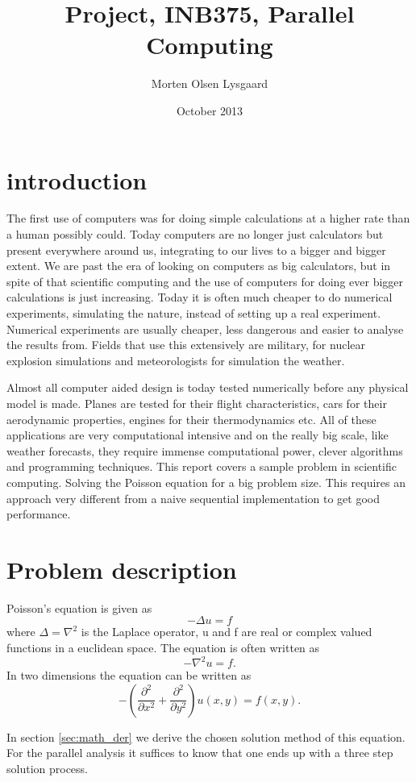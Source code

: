 \documentclass{article}
\title{Project, INB375, Parallel Computing}
\author{Morten Olsen Lysgaard}
\date{October 2013}
\begin{document}
\maketitle

\section{introduction}
The first use of computers was for doing simple calculations at a higher rate
than a human possibly could. Today computers are no longer just calculators but
present everywhere around us, integrating to our lives to a bigger and bigger extent.
We are past the era of looking on computers as big calculators, but in spite of that
scientific computing and the use of computers for doing ever bigger calculations is just increasing.
Today it is often much cheaper to do numerical experiments, simulating the nature, instead of
setting up a real experiment. Numerical experiments are usually cheaper, less
dangerous and easier to analyse the results from. Fields that use this extensively
are military, for nuclear explosion simulations and meteorologists for simulation the weather.

Almost all computer aided design is today tested numerically before any physical model is made.
Planes are tested for their flight characteristics, cars for their aerodynamic properties, engines
for their thermodynamics etc. All of these applications are very computational intensive and on the
really big scale, like weather forecasts, they require immense computational power, clever algorithms
and programming techniques. This report covers a sample problem in scientific computing. Solving the
Poisson equation for a big problem size. This requires an approach very different from a naive
sequential implementation to get good performance.

\section{Problem description}
\label{sec:sol_steps}
Poisson's equation is given as
\[
-\Delta u = f
\]
where $\Delta = \nabla^2$ is the Laplace operator, u and f are real or complex valued functions in a
euclidean space. The equation is often written as
\[
-\nabla^2 u = f.
\]
In two dimensions the equation can be written as
\[
-\left( \frac{\partial^2}{\partial x^2} + \frac{\partial^2}{\partial y^2} \right) u(x,y) = f(x,y).
\]

In section \ref{sec:math_der} we derive the chosen solution method of this equation. 
For the parallel analysis it suffices to know that one ends up with a three step solution
process.
\end{document}
